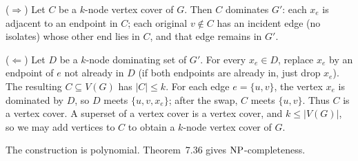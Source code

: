 \begin{soln}
($\Rightarrow$) Let $C$ be a $k$-node vertex cover of $G$. Then $C$ dominates $G'$: each $x_e$ is adjacent to an endpoint in $C$; each original $v\notin C$ has an incident edge (no isolates) whose other end lies in $C$, and that edge remains in $G'$.

($\Leftarrow$) Let $D$ be a $k$-node dominating set of $G'$. For every $x_e\in D$, replace $x_e$ by an endpoint of $e$ not already in $D$ (if both endpoints are already in, just drop $x_e$). The resulting $C\subseteq V(G)$ has $|C|\le k$. For each edge $e=\{u,v\}$, the vertex $x_e$ is dominated by $D$, so $D$ meets $\{u,v,x_e\}$; after the swap, $C$ meets $\{u,v\}$. Thus $C$ is a vertex cover. A superset of a vertex cover is a vertex cover, and $k\le|V(G)|$, so we may add vertices to $C$ to obtain a $k$-node vertex cover of $G$.

The construction is polynomial. Theorem~7.36 gives $\mathrm{NP}$-completeness.
\end{soln}

